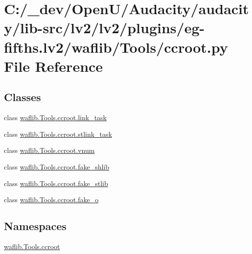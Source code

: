 \hypertarget{lv2_2plugins_2eg-fifths_8lv2_2waflib_2_tools_2ccroot_8py}{}\section{C\+:/\+\_\+dev/\+Open\+U/\+Audacity/audacity/lib-\/src/lv2/lv2/plugins/eg-\/fifths.lv2/waflib/\+Tools/ccroot.py File Reference}
\label{lv2_2plugins_2eg-fifths_8lv2_2waflib_2_tools_2ccroot_8py}
\subsection*{Classes}
\begin{DoxyCompactItemize}
\item 
class \hyperlink{classwaflib_1_1_tools_1_1ccroot_1_1link__task}{waflib.\+Tools.\+ccroot.\+link\+\_\+task}
\item 
class \hyperlink{classwaflib_1_1_tools_1_1ccroot_1_1stlink__task}{waflib.\+Tools.\+ccroot.\+stlink\+\_\+task}
\item 
class \hyperlink{classwaflib_1_1_tools_1_1ccroot_1_1vnum}{waflib.\+Tools.\+ccroot.\+vnum}
\item 
class \hyperlink{classwaflib_1_1_tools_1_1ccroot_1_1fake__shlib}{waflib.\+Tools.\+ccroot.\+fake\+\_\+shlib}
\item 
class \hyperlink{classwaflib_1_1_tools_1_1ccroot_1_1fake__stlib}{waflib.\+Tools.\+ccroot.\+fake\+\_\+stlib}
\item 
class \hyperlink{classwaflib_1_1_tools_1_1ccroot_1_1fake__o}{waflib.\+Tools.\+ccroot.\+fake\+\_\+o}
\end{DoxyCompactItemize}
\subsection*{Namespaces}
\begin{DoxyCompactItemize}
\item 
 \hyperlink{namespacewaflib_1_1_tools_1_1ccroot}{waflib.\+Tools.\+ccroot}
\end{DoxyCompactItemize}
